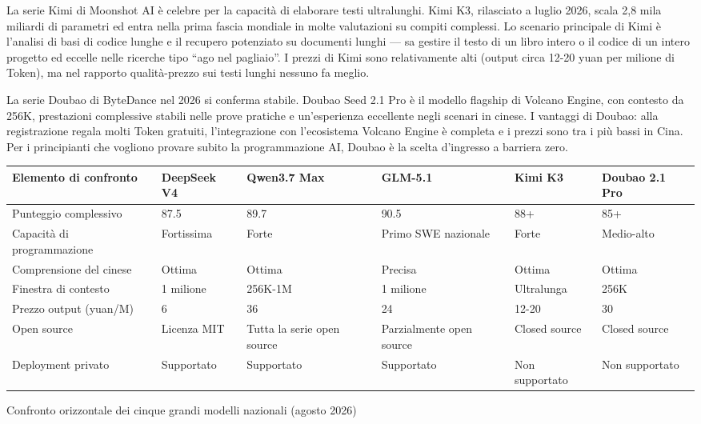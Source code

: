 
La serie Kimi di Moonshot AI è celebre per la capacità di elaborare testi ultralunghi. Kimi K3, rilasciato a luglio 2026, scala 2,8 mila miliardi di parametri ed entra nella prima fascia mondiale in molte valutazioni su compiti complessi. Lo scenario principale di Kimi è l'analisi di basi di codice lunghe e il recupero potenziato su documenti lunghi — sa gestire il testo di un libro intero o il codice di un intero progetto ed eccelle nelle ricerche tipo “ago nel pagliaio”. I prezzi di Kimi sono relativamente alti (output circa 12-20 yuan per milione di Token), ma nel rapporto qualità-prezzo sui testi lunghi nessuno fa meglio.


La serie Doubao di ByteDance nel 2026 si conferma stabile. Doubao Seed 2.1 Pro è il modello flagship di Volcano Engine, con contesto da 256K, prestazioni complessive stabili nelle prove pratiche e un'esperienza eccellente negli scenari in cinese. I vantaggi di Doubao: alla registrazione regala molti Token gratuiti, l'integrazione con l'ecosistema Volcano Engine è completa e i prezzi sono tra i più bassi in Cina. Per i principianti che vogliono provare subito la programmazione AI, Doubao è la scelta d'ingresso a barriera zero.

\begin{center}
\begin{tabularx}{\linewidth}{|X|X|X|X|X|X|}
\hline
\textbf{Elemento di confronto} & \textbf{DeepSeek V4} & \textbf{Qwen3.7 Max} & \textbf{GLM-5.1} & \textbf{Kimi K3} & \textbf{Doubao 2.1 Pro} \tabularnewline
\hline
Punteggio complessivo & 87.5 & 89.7 & 90.5 & 88+ & 85+ \tabularnewline
Capacità di programmazione & Fortissima & Forte & Primo SWE nazionale & Forte & Medio-alto \tabularnewline
Comprensione del cinese & Ottima & Ottima & Precisa & Ottima & Ottima \tabularnewline
Finestra di contesto & 1 milione & 256K-1M & 1 milione & Ultralunga & 256K \tabularnewline
Prezzo output (yuan/M) & 6 & 36 & 24 & 12-20 & 30 \tabularnewline
Open source & Licenza MIT & Tutta la serie open source & Parzialmente open source & Closed source & Closed source \tabularnewline
Deployment privato & Supportato & Supportato & Supportato & Non supportato & Non supportato \tabularnewline
\hline
\end{tabularx}
\end{center}

\begin{center}\small\color{gray}Confronto orizzontale dei cinque grandi modelli nazionali (agosto 2026)\end{center}

